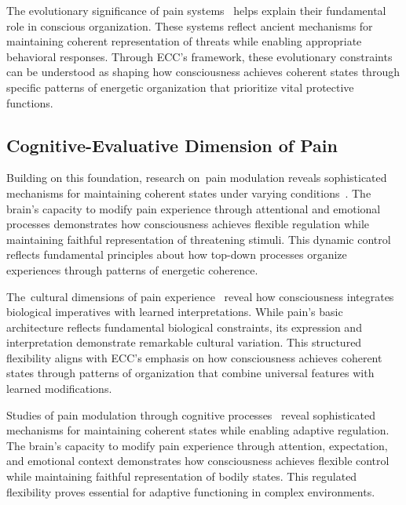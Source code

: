 The evolutionary significance of pain systems~\cite{Melzack1965, van2025processes} helps explain their fundamental role in conscious organization. These systems reflect ancient mechanisms for maintaining coherent representation of threats while enabling appropriate behavioral responses. Through ECC's framework, these evolutionary constraints can be understood as shaping how consciousness achieves coherent states through specific patterns of energetic organization that prioritize vital protective functions.

\subsection*{Cognitive-Evaluative Dimension of Pain}

Building on this foundation, research on~pain modulation reveals sophisticated mechanisms for maintaining coherent states under varying conditions~\cite{Wiech2008, zheng2025unbearable}. The brain's capacity to modify pain experience through attentional and emotional processes demonstrates how consciousness achieves flexible regulation while maintaining faithful representation of threatening stimuli. This dynamic control reflects fundamental principles about how top-down processes organize experiences through patterns of energetic coherence.

The~cultural dimensions of pain experience~\cite{Morris1991, butlin2023consciousnessartificialintelligenceinsights} reveal how consciousness integrates biological imperatives with learned interpretations. While pain's basic architecture reflects fundamental biological constraints, its expression and interpretation demonstrate remarkable cultural variation. This structured flexibility aligns with ECC's emphasis on how consciousness achieves coherent states through patterns of organization that combine universal features with learned modifications.

Studies of pain modulation through cognitive processes~\cite{Wiech2008, pinotsis2023cytoelectric} reveal sophisticated mechanisms for maintaining coherent states while enabling adaptive regulation. The brain's capacity to modify pain experience through attention, expectation, and emotional context demonstrates how consciousness achieves flexible control while maintaining faithful representation of bodily states. This regulated flexibility proves essential for adaptive functioning in complex environments.


